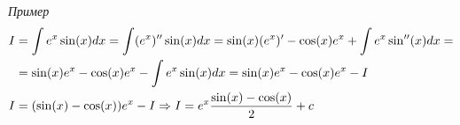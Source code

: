 \documentclass{article}
\begin{document}
{\it Пример}
\begin{align*}
	I
	  & =\int e^{x}\sin(x)dx=\int (e^{x})''\sin(x)dx=\sin(x)(e^{x})'-\cos(x)e^{x}+\int e^{x}\sin''(x)dx= \\
	  & =\sin(x)e^{x}-\cos(x)e^{x}-\int e^{x}\sin(x)dx=\sin(x)e^{x}-\cos(x)e^{x}-I                       \\
	I & =(\sin(x)-\cos(x))e^{x}-I\Rightarrow I=e^{x}\frac{\sin(x)-\cos(x)}{2}+c
\end{align*}
\end{document}
